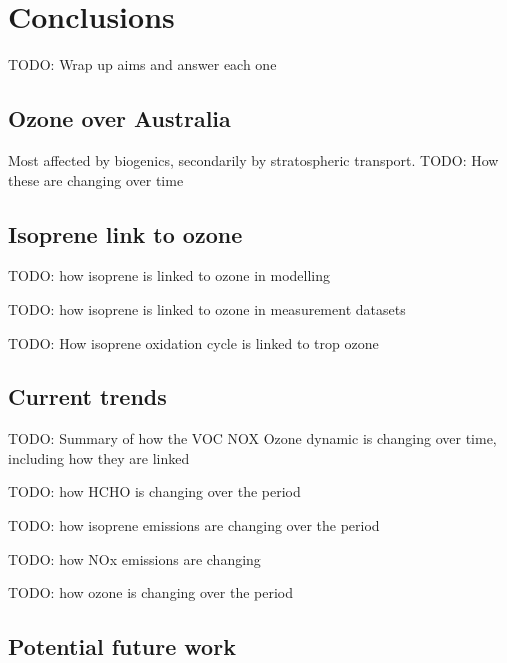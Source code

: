 \chapter{Conclusions} %
\label{Conclusions}

TODO: Wrap up aims and answer each one

\section{Ozone over Australia}
\label{Conclusions:ozone}
  
  Most affected by biogenics, secondarily by stratospheric transport.
  TODO: How these are changing over time

\section{Isoprene link to ozone}
\label{Conclusions:isoprene}

  TODO: how isoprene is linked to ozone in modelling

  TODO: how isoprene is linked to ozone in measurement datasets
  
  TODO: How isoprene oxidation cycle is linked to trop ozone
  
\section{Current trends}
\label{Conclusions:trends}

  TODO: Summary of how the VOC NOX Ozone dynamic is changing over time, including how they are linked
  
  TODO: how HCHO is changing over the period

  TODO: how isoprene emissions are changing over the period
  
  TODO: how NOx emissions are changing
  
  TODO: how ozone is changing over the period
  
\section{Potential future work}
\label{Conclusions:future}